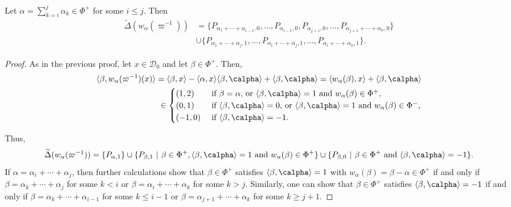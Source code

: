     \begin{lemma}\label{lem_wvarpi}
        Let $\alpha=\sum_{k=i}^{j}\alpha_k\in\Phi^+$ for some $i\leq j$. Then
        \begin{align*}
            \widetilde{\Delta}(w_\alpha(\varpi^{-1}))&=\{P_{\alpha_1+\cdots+\alpha_{i-1},0},\ldots,P_{\alpha_{i-1},0},P_{\alpha_{j+1},0},\ldots,P_{\alpha_{j+1}+\cdots+\alpha_{n},0}\}\\
            &\cup\{P_{\alpha_1+\cdots+\alpha_j,1},\ldots,P_{\alpha_i+\cdots+\alpha_{j},1},\ldots,P_{\alpha_i+\cdots+\alpha_n,1}\}.
        \end{align*}
    \end{lemma}

    \begin{proof}
        As in the previous proof, let $x\in\mathcal{D}_0$ and let $\beta\in\Phi^+$. Then,
        \begin{align*}
            \langle\beta,w_\alpha(\varpi^{-1})(x)\rangle=\langle\beta,x\rangle-\langle\alpha,x\rangle\langle\beta,\calpha\rangle+\langle\beta,\calpha\rangle=\langle w_\alpha(\beta),x\rangle+\langle\beta,\calpha\rangle\\
            \in
            \begin{cases}
                (1,2) &\text{ if } \beta=\alpha \text{, or } \langle\beta,\calpha\rangle=1 \text{ and } w_\alpha(\beta)\in\Phi^+,\\
                (0,1) &\text{ if } \langle\beta,\calpha\rangle=0 \text{, or }\langle\beta,\calpha\rangle=1 \text{ and }w_\alpha(\beta)\in\Phi^-,\\
                (-1,0) &\text{ if } \langle\beta,\calpha\rangle=-1.
            \end{cases}
        \end{align*}
    
        Thus,
        \begin{equation*}
            \widetilde{\Delta}(w_\alpha(\varpi^{-1}))=\{P_{\alpha,1}\}\cup\{P_{\beta,1}\ |\ \beta\in\Phi^+,\langle\beta,\calpha\rangle=1 \text{ and }w_\alpha(\beta)\in\Phi^+\}\cup\{P_{\beta,0}\ |\ \beta\in\Phi^+\text{ and }\langle\beta,\calpha\rangle=-1\}.
        \end{equation*}
        If $\alpha=\alpha_i+\cdots+\alpha_j$, then further calculations show that $\beta\in\Phi^+$ satisfies $\langle\beta,\calpha\rangle=1$ with $w_\alpha(\beta)=\beta-\alpha\in\Phi^+$ if and only if $\beta=\alpha_k+\cdots+\alpha_j$ for some $k<i$ or $\beta=\alpha_i+\cdots+\alpha_k$ for some $k>j$. Similarly, one can show that $\beta\in\Phi^+$ satisfies $\langle\beta,\calpha\rangle=-1$ if and only if $\beta=\alpha_k+\cdots+\alpha_{i-1}$ for some $k\leq i-1$ or $\beta=\alpha_{j+1}+\cdots+\alpha_k$ for some $k\geq j+1$.
    \end{proof}



